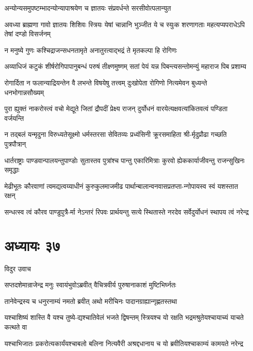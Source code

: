 \twolineshloka
{अन्योन्यसमुपष्टम्भादन्योन्यापाश्रयेण च}
{ज्ञातयः संप्रवर्धन्ते सरसीवोत्पलान्युत}


\threelineshloka
{अवध्या ब्राह्मणा गावो ज्ञातयः शिशिवः स्त्रियः}
{येषां चान्नानि भुञ्जीत ये च स्युःक शरणागताः}
{महत्यप्यपराधेऽपि तेषां दण्डो विसर्जनम्}


\twolineshloka
{न मनुष्ये गुणः कश्चिद्राजन्सधनतामृते}
{अनातुरत्वाद्भद्रं ते मृतकल्पा हि रोगिणः}


\twolineshloka
{अव्याधिजं कटुकं शीर्षरोगिपापानुबन्धं परुषं तीक्ष्णमुष्णम्}
{सतां पेयं यन्न पिबन्त्यसन्तोमन्युं महाराज पिब प्रशाम्य}


\twolineshloka
{रोगार्दिता न फलान्याद्रियन्तेन वै लभन्ते विषयेषु तत्त्वम्}
{दुःखोपेता रोगिणो नित्यमेवन बुध्यन्ते धनभोगान्नसौख्यम्}


\twolineshloka
{पुरा ह्युक्तं नाकरोस्त्वं वचो मेद्यूते जितां द्रौपदीं प्रेक्ष्य राजन्}
{दुर्योधनं वारयेत्यक्षवत्यांकितवत्वं पण्डिता वर्जयन्ति}


\twolineshloka
{न तद्बलं यन्मृदुना विरुध्यतेसूक्ष्मो धर्मस्तरसा सेवितव्यः}
{प्रध्वंसिनी क्रूरसमाहिता श्री-र्मृदुप्रौढा गच्छति पुत्रपौत्रान्}


\twolineshloka
{धार्तराष्ट्राः पाण्डवान्पालयन्तुपाण्डोः सुतास्तव पुत्रांश्च पान्तु}
{एकारिमित्राः कुरवो ह्येककार्याजीवन्तु राजन्सुखिनः समृद्धाः}


\twolineshloka
{मेढीभूतः कौरवाणां त्वमद्यत्वय्याधीनं कुरुकुलमाजमीढ}
{पार्थान्बालान्वनवासप्रतप्ता-न्गोपायस्व स्वं यशस्तात रक्षन्}


\twolineshloka
{सन्धत्स्व त्वं कौरव पाण्डुपुत्रै-र्मा नेऽन्तरं रिपवः प्रार्थयन्तु}
{सत्ये स्थितास्ते नरदेव सर्वेदुर्योधनं स्थापय त्वं नरेन्द्र}


\chapter{अध्यायः ३७}
\twolineshloka
{विदुर उवाच}
{}


\twolineshloka
{सप्तदशेमान्राजेन्द्र मनुः स्वायंभुवोऽब्रवीत्}
{वैचित्रवीर्य पुरुषानाकाशं मुष्टिभिर्घ्नतः}


\twolineshloka
{तानेवेन्द्रस्य च धनुरनाम्यं नमतो ब्रवीत्}
{अथो मरीचिनः पादानग्राह्यान्गृह्णतस्तथा}


\twolineshloka
{यश्चाशिष्यं शास्ति वै यश्च तुष्ये-द्यश्चातिवेलं भजते द्विषन्तम्}
{स्त्रियश्च यो रक्षति भद्रमश्रुतेयश्चायाच्यं याचते कत्थते वा}


\threelineshloka
{यश्चाभिजातः प्रकरोत्यकार्यंयश्चाबलो बलिना नित्यवैरी}
{अश्रद्दधानाय च यो ब्रवीतियश्चाकाम्यं कामयते नरेन्द्र}
{}


